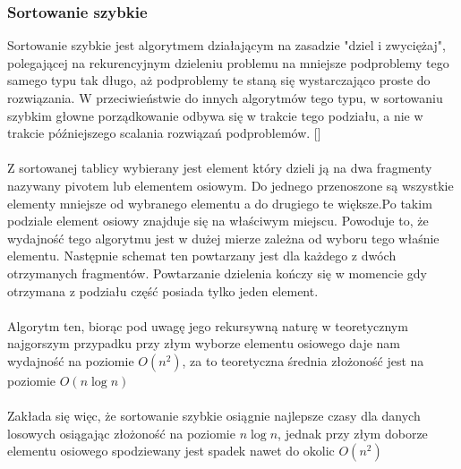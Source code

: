 \documentclass{article}
\begin{document}
      \subsubsection{Sortowanie szybkie}
        Sortowanie szybkie jest algorytmem działającym na zasadzie "dziel i zwyciężaj",
        polegającej na rekurencyjnym dzieleniu problemu na mniejsze podproblemy tego samego typu tak długo,
        aż podproblemy te staną się wystarczająco proste do rozwiązania.
        W przeciwieństwie do innych algorytmów tego typu, w sortowaniu szybkim głowne porządkowanie odbywa się w trakcie tego podziału, a nie w trakcie późniejszego scalania rozwiązań podproblemów. [\cite{wikiDziel}]
        \\\\Z sortowanej tablicy wybierany jest element który dzieli ją na dwa fragmenty nazywany pivotem lub elementem osiowym. Do jednego przenoszone są wszystkie elementy mniejsze od wybranego elementu a do drugiego te większe.Po takim podziale element osiowy znajduje się na właściwym miejscu. 
        Powoduje to, że wydajność tego algorytmu jest w dużej mierze zależna od wyboru tego właśnie elementu.
        Następnie schemat ten powtarzany jest dla każdego z dwóch otrzymanych fragmentów. Powtarzanie dzielenia kończy się w momencie gdy otrzymana z podziału część posiada tylko jeden element.
        \\\\Algorytm ten, biorąc pod uwagę jego rekursywną naturę w teoretycznym najgorszym przypadku przy złym wyborze elementu osiowego daje nam wydajność na poziomie $O(n^2)$, za to teoretyczna średnia złożoność jest na poziomie $O(n\log{n})$ 
        \\\\Zakłada się więc, że sortowanie szybkie osiągnie najlepsze czasy dla danych losowych osiągając złożoność na poziomie $n\log{n}$, jednak przy złym doborze elementu osiowego spodziewany jest spadek nawet do okolic $O(n^2)$ 
\end{document}
